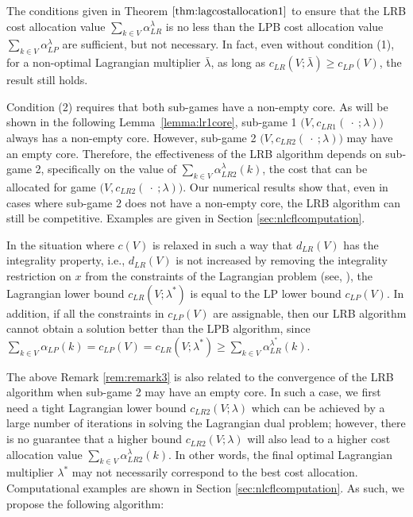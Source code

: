 \documentclass[ijoc,nonblindrev]{informs3} %
\begin{document}
\begin{remark}
The conditions given in Theorem $\ref{thm:lagcostallocation1}$ to ensure that the LRB cost allocation value $\sum_{k\in V} \alpha_{LR}^{\lambda}$ is no less than the LPB cost allocation value $\sum_{k\in V}\alpha_{LP}^{\lambda}$ are sufficient, but not necessary.
In fact, even without condition (1), for a non-optimal Lagrangian multiplier $\bar{\lambda}$, as long as $c_{LR}(V;\bar{\lambda}) \geq c_{LP}(V)$, the result still holds.
\end{remark}

\begin{remark}\label{rem:remark3}
Condition (2) requires that both sub-games have a non-empty core. As will be shown in the following Lemma~\ref{lemma:lr1core}, sub-game 1 $\big(V,c_{LR1}(\ \cdot\ ;\lambda)\big)$ always has a non-empty core.
However, sub-game 2 $\big(V,c_{LR2}(\ \cdot\ ;\lambda)\big)$ may have an empty core.
Therefore, the effectiveness of the LRB algorithm depends on sub-game 2, specifically on the value of $\sum_{k \in V} \alpha_{LR2}^{\lambda}(k)$, the cost that can be allocated for game $\big(V,c_{LR2}(\ \cdot \ ;\lambda)\big)$. Our numerical results show that, even in cases where sub-game 2 does not have a non-empty core, the LRB algorithm can still be competitive. Examples are given in Section \ref{sec:nlcflcomputation}.
\end{remark}


\begin{remark}\label{rem:remark4-thm2}
In the situation where $c(V)$ is relaxed in such a way that $d_{LR}(V)$ has the integrality property, i.e., $d_{LR}(V)$ is not increased by removing the integrality restriction on $x$ from the constraints of the Lagrangian problem (see, \citealt{Geoffrion}), the Lagrangian lower bound $c_{LR}(V;\lambda^*)$ is equal to the LP lower bound $c_{LP}(V)$.
In addition, if all the constraints in $c_{LP}(V)$ are assignable, then our LRB algorithm cannot obtain a solution better than the LPB algorithm, since $\sum_{k \in V}\alpha_{LP}(k) = c_{LP}(V) = c_{LR}(V;\lambda^*) \geq \sum_{k \in V} \alpha_{LR}^{\lambda^*}(k) $.
\end{remark}


The above Remark \ref{rem:remark3} is also related to the convergence of the LRB algorithm when sub-game 2 may have an empty core. In such a case,  we first need a  tight Lagrangian lower bound $c_{LR2}(V;\lambda)$ which can be achieved by a large number of iterations in solving the Lagrangian dual problem; however, there is no guarantee  that a higher bound $c_{LR2}(V;\lambda)$ will also lead to a higher cost allocation value $ \sum_{k \in V} \alpha_{LR2}^{\lambda}(k)$. In other words, the final optimal Lagrangian multiplier $\lambda^*$ may not necessarily correspond to the best cost allocation. Computational examples are shown in Section \ref{sec:nlcflcomputation}. As such, we propose the following algorithm:
\end{document}
